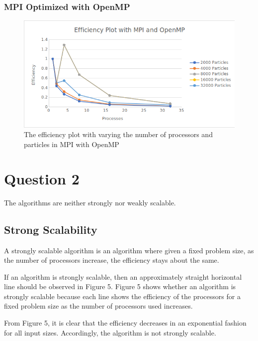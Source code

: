 \documentclass{article}
\begin{document}
\subsubsection{MPI Optimized with OpenMP}
\begin{figure}[H]
	\begin{center}
		\hspace*{-0.5cm}                                                           
  		\includegraphics[scale=0.6]{Report_Assets/efficiencyomp.png}
  	\end{center}
  	\caption{The efficiency plot with varying the number of processors and particles in MPI with OpenMP}
\end{figure}

\section{Question 2}
The algorithms are neither strongly nor weakly scalable.

\subsection{Strong Scalability}
A strongly scalable algorithm is an algorithm where given a fixed problem size, as the number of processors increase, the efficiency stays about the same.

If an algorithm is strongly scalable, then an approximately straight horizontal line should be observed in Figure 5. Figure 5 shows whether an algorithm is strongly scalable because each line shows the efficiency of the processors for a fixed problem size as the number of processors used increases.

From Figure 5, it is clear that the efficiency decreases in an exponential fashion for all input sizes. Accordingly, the algorithm is not strongly scalable.
\end{document}
